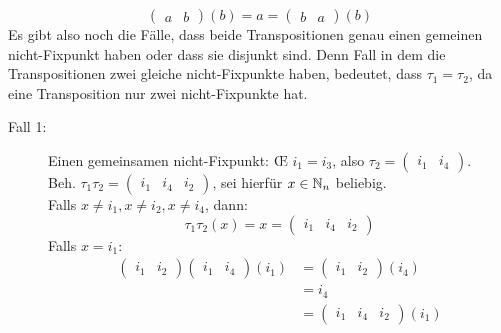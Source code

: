 \documentclass[sectionformat = aufgabe]{gadsescript}
\begin{document}
\begin{enumerate}[label=(\alph*)]
\[		\]
		\[
			\begin{pmatrix} a & b \end{pmatrix} (b) = a = \begin{pmatrix} b & a \end{pmatrix} (b)
		\]
		Es gibt also noch die Fälle, dass beide Transpositionen genau einen gemeinen nicht-Fixpunkt haben oder dass sie disjunkt sind. Denn Fall in dem die Transpositionen zwei gleiche nicht-Fix\-punkte haben, bedeutet, dass $ \tau_1 = \tau_2 $, da eine Transposition nur zwei nicht-Fixpunkte hat.
		\begin{description}
			\item[Fall 1:] Einen gemeinsamen nicht-Fixpunkt: \OE{} $ i_1 = i_3 $, also $ \tau_2 = \begin{pmatrix} i_1  & i_4 \end{pmatrix}  $.\\
				Beh. $ \tau_1 \tau_2 = \begin{pmatrix} i_1 & i_4 & i_2 \end{pmatrix}  $, sei hierfür $ x \in \mathbb{N} _n $ beliebig.\\
				Falls $ x \neq i_1, x\neq i_2, x \neq i_4 $, dann:
				\[
					\tau_1 \tau_2 (x) = x = \begin{pmatrix} i_1 & i_4 & i_2 \end{pmatrix} 
				\]
				Falls $ x = i_1 $:
				\begin{align*}
					\begin{pmatrix} i_1 & i_2 \end{pmatrix} \begin{pmatrix} i_1 & i_4 \end{pmatrix} (i_1) &= \begin{pmatrix} i_1 & i_2 \end{pmatrix} (i_4) \\
							    &= i_4 \\
							    &= \begin{pmatrix} i_1 & i_4 & i_2 \end{pmatrix} (i_1)
				\end{align*}
				

\end{description}
\end{enumerate}
\end{document}
